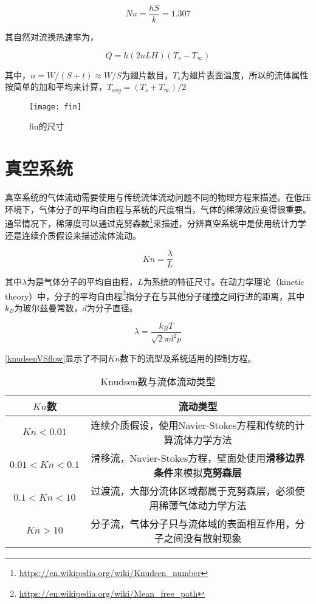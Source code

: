 \[ Nu = \frac{hS}{k} = 1.307 \]

其自然对流换热速率为，

\[ Q=h(2nLH)(T_s-T_{\infty}) \]

其中，$ n=W/(S+t) \approx W/S $为翅片数目，$ T_s $为翅片表面温度，所以的流体属性按简单的加和平均来计算，$ T_{avg} = (T_s+T_{\infty})/2 $

\begin{figure}[h]
    \centering
    \texttt{[image: fin]}
    \caption{fin的尺寸}
\end{figure}

\section{真空系统}
真空系统的气体流动需要使用与传统流体流动问题不同的物理方程来描述。在低压环境下，气体分子的平均自由程与系统的尺度相当，气体的稀薄效应变得很重要。通常情况下，稀薄度可以通过克努森数\footnote{\url{https://en.wikipedia.org/wiki/Knudsen_number}}来描述，分辨真空系统中是使用统计力学还是连续介质假设来描述流体流动。

\begin{equation}\label{Knudsen}
Kn = \frac{\lambda}{L}
\end{equation}

其中$ \lambda $为是气体分子的平均自由程，$ L $为系统的特征尺寸。在动力学理论（kinetic theory）中，分子的平均自由程\footnote{\url{https://en.wikipedia.org/wiki/Mean_free_path}}指分子在与其他分子碰撞之间行进的距离，其中$ k_B $为玻尔兹曼常数，$ d $为分子直径。

\begin{equation}
\lambda = \frac{k_B T}{\sqrt{2}\pi d^2 p}
\end{equation}

\autoref{knudsenVSflow}显示了不同$ Kn $数下的流型及系统适用的控制方程。

\begin{table}[h]
    \centering
    \caption{Knudsen数与流体流动类型}
    \label{knudsenVSflow}
    \begin{tabular}{cc}
        \toprule
        $ Kn $数 & 流动类型 \\
        \midrule
        $ Kn<0.01 $ & 连续介质假设，使用Navier-Stokes方程和传统的计算流体力学方法 \\
        $ 0.01<Kn<0.1 $ & 滑移流，Navier-Stokes方程，壁面处使用\textbf{滑移边界条件}来模拟\textbf{克努森层} \\
        $ 0.1<Kn<10 $ & 过渡流，大部分流体区域都属于克努森层，必须使用稀薄气体动力学方法 \\
        $ Kn>10 $ & 分子流，气体分子只与流体域的表面相互作用，分子之间没有散射现象 \\
        \bottomrule
    \end{tabular}
\end{table}

